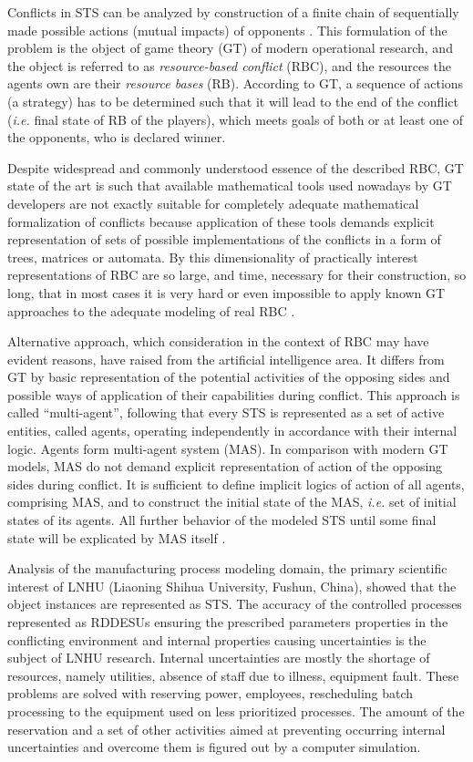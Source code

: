 \documentclass[conference]{IEEEtran}
\begin{document}
Conflicts in STS can be analyzed by construction of a finite chain of sequentially made possible actions (mutual impacts) of opponents \cite{rbg}. This formulation of the problem is the object of game theory (GT) of modern operational research, and the object is referred to as \emph{resource-based conflict} (RBC), and the resources the agents own are their \emph{resource bases} (RB). According to GT, a sequence of actions (a strategy) has to be determined such that it will lead to the end of the conflict (\emph{i.e.} final state of RB of the players), which meets goals of both or at least one of the opponents, who is declared winner.

Despite widespread and commonly understood essence of the described RBC, GT state of the art is such that available mathematical tools used nowadays by GT developers are not exactly suitable for completely adequate mathematical formalization of conflicts because application of these tools demands explicit representation of sets of possible implementations of the conflicts in a form of trees, matrices or automata. By this dimensionality of practically interest representations of RBC are so large, and time, necessary for their construction, so long, that in most cases it is very hard or even impossible to apply known GT approaches to the adequate modeling of real RBC \cite{rbg}.

Alternative approach, which consideration in the context of RBC may have evident reasons, have raised from the artificial intelligence area. It differs from GT by basic representation of the potential activities of the opposing sides and possible ways of application of their capabilities during conflict. This approach is called ``multi-agent'', following that every STS is represented as a set of active entities, called agents, operating independently in accordance with their internal logic. Agents form multi-agent system (MAS). In comparison with modern GT models, MAS do not demand explicit representation of action of the opposing sides during conflict. It is sufficient to define implicit logics of action of all agents, comprising MAS, and to construct the initial state of the MAS, \emph{i.e.} set of initial states of its agents. All further behavior of the modeled STS until some final state will be explicated by MAS itself \cite{rbg}.

Analysis of the manufacturing process modeling domain, the primary scientific interest of LNHU (Liaoning Shihua University, Fushun, China), showed that the object instances are represented as STS. The accuracy of the controlled processes represented as RDDESUs ensuring the prescribed parameters properties in the conflicting environment and internal properties causing uncertainties is the subject of LNHU research.  Internal uncertainties are mostly the shortage of resources, namely utilities, absence of staff due to illness, equipment fault.  These problems are solved with reserving power, employees, rescheduling batch processing to the equipment used on less prioritized processes.  The amount of the reservation and a set of other activities aimed at preventing occurring internal uncertainties and overcome them is figured out by a computer simulation.
\end{document}
